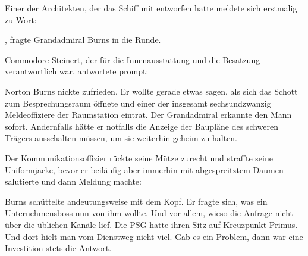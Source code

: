 \par

Einer der Architekten, der das Schiff mit entworfen hatte meldete sich erstmalig zu Wort: 

\par

, fragte Grandadmiral Burns in die Runde. 

\par

Commodore Steinert, der für die Innenausstattung und die Besatzung verantwortlich war, antwortete prompt: 

\par

Norton Burns nickte zufrieden. Er wollte gerade etwas sagen, als sich das Schott zum Besprechungsraum öffnete und einer der insgesamt sechsundzwanzig Meldeoffiziere der Raumstation eintrat. Der Grandadmiral erkannte den Mann sofort. Andernfalls hätte er notfalls die Anzeige der Baupläne des schweren Trägers ausschalten müssen, um sie weiterhin geheim zu halten.

\par

Der Kommunikationsoffizier rückte seine Mütze zurecht und straffte seine Uniformjacke, bevor er beiläufig aber immerhin mit abgespreitztem Daumen salutierte und dann Meldung machte: 

\par

Burns schüttelte andeutungsweise mit dem Kopf. Er fragte sich, was ein Unternehmensboss nun von ihm wollte. Und vor allem, wieso die Anfrage nicht über die üblichen Kanäle lief. Die PSG hatte ihren Sitz auf Kreuzpunkt Primus. Und dort hielt man vom Dienstweg nicht viel. Gab es ein Problem, dann war eine Investition stets die Antwort.

